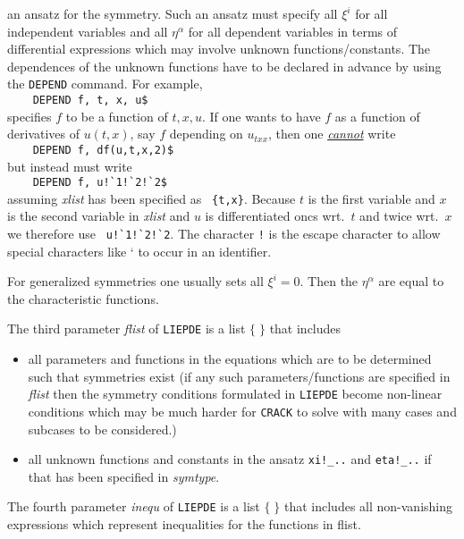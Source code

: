 \begin{description}
  an ansatz for the symmetry. Such an ansatz must specify all $\xi^i$
  for all independent variables and all $\eta^{\alpha}$ for all
  dependent variables in terms of differential expressions which may
  involve unknown functions/constants.  The dependences of the unknown
  functions have to be declared in advance by using the
  \texttt{DEPEND} command. For example, \\
  \verb+    DEPEND f, t, x, u$+ \\
  specifies $f$ to be a function of $t,x,u$. If one wants to have $f$
  as a function of derivatives of $u(t,x)$, say $f$ depending on
  $u_{txx}$, then one \underline{\textit{cannot}} write \\
  \verb+    DEPEND f, df(u,t,x,2)$+ \\
  but instead must write \\
  \verb+    DEPEND f, u!`1!`2!`2$+ \\
  assuming \textit{xlist} has been specified as \verb+ {t,x}+.
  Because $t$ is the first variable and $x$ is the second variable in
  \textit{xlist} and $u$ is differentiated oncs wrt.\ $t$ and twice
  wrt.\ $x$ we therefore use \verb+ u!`1!`2!`2+. The character
  \texttt{!} is the escape character to allow special characters like
  ` to occur in an identifier.

  For generalized symmetries one usually sets all $\xi^i=0$.  Then the
  $\eta^{\alpha}$ are equal to the characteristic functions.
\end{description}
\noindent The third parameter \textit{flist} of \texttt{LIEPDE} is a list $\{\;\}$
that includes
\begin{itemize}
\item all parameters and functions in the equations which are to
      be determined such that symmetries exist (if any such
      parameters/functions are
      specified in \textit{flist} then the symmetry conditions
      formulated in \texttt{LIEPDE}
      become non-linear conditions which may be much harder for
      \texttt{CRACK} to solve with many cases and subcases to be considered.)
\item all unknown functions and constants in the ansatz
      \verb+xi!_..+ and \verb+eta!_..+
      if that has been specified in \textit{symtype}.
\end{itemize}
\noindent The fourth parameter \textit{inequ} of \texttt{LIEPDE} is a list $\{\;\}$
that includes all non-vanishing expressions which represent
inequalities for the functions in flist.

